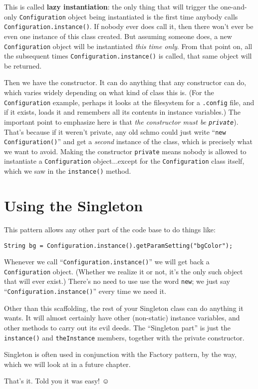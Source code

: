 This is called \textbf{lazy instantiation}: the only thing that will trigger
the one-and-only \texttt{Configuration} object being instantiated is the first
time anybody calls \texttt{Configuration.instance()}. If nobody ever does call
it, then there won't ever be even one instance of this class created. But
assuming someone does, a new \texttt{Configuration} object will be instantiated
\textit{this time only}. From that point on, all the subsequent times
\texttt{Configuration.instance()} is called, that same object will be returned.

Then we have the constructor. It can do anything that any constructor can do,
which varies widely depending on what kind of class this is. (For the
\texttt{Configuration} example, perhaps it looks at the filesystem for a
\texttt{.config} file, and if it exists, loads it and remembers all its
contents in instance variables.) The important point to emphasize here is that
\textit{the constructor must be \texttt{private}}). That's because if it
weren't private, any old schmo could just write ``\texttt{new
Configuration()}'' and get a \textit{second} instance of the class, which is
precisely what we want to avoid. Making the constructor \texttt{private} means
nobody is allowed to instantiate a \texttt{Configuration} object...except for
the \texttt{Configuration} class itself, which we saw in the
\texttt{instance()} method.


\section{Using the Singleton}

This pattern allows any other part of the code base to do things like:

\begin{Verbatim}[fontsize=\footnotesize,samepage=true,frame=single]
String bg = Configuration.instance().getParamSetting("bgColor");
\end{Verbatim}

Whenever we call ``\texttt{Configuration.instance()}'' we will get back a\\
\texttt{Configuration} object. (Whether we realize it or not, it's the only
such object that will ever exist.) There's no need to use use the word
\texttt{new}; we just say ``\texttt{Configuration.instance()}'' every time we
need it.

Other than this scaffolding, the rest of your Singleton class can do anything
it wants. It will almost certainly have other (non-static) instance variables,
and other methods to carry out its evil deeds. The ``Singleton part'' is just
the \texttt{instance()} and \texttt{theInstance} members, together with the
private constructor.

Singleton is often used in conjunction with the Factory pattern, by the way,
which we will look at in a future chapter.

That's it. Told you it was easy! $\smiley$
